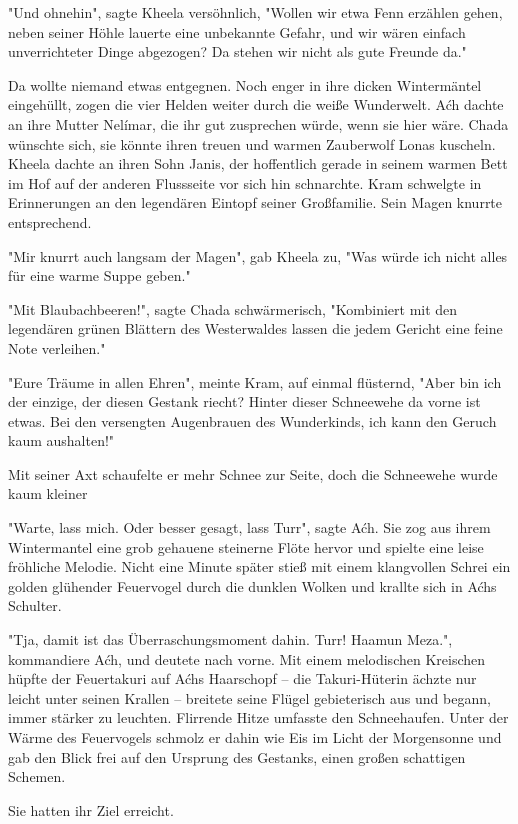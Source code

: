 \documentclass[10pt, a4paper, oneside]{book}
\begin{document}
"Und ohnehin", sagte Kheela versöhnlich, "Wollen wir etwa Fenn erzählen gehen, neben seiner Höhle lauerte eine unbekannte Gefahr, und wir wären einfach unverrichteter Dinge abgezogen? Da stehen wir nicht als gute Freunde da."

Da wollte niemand etwas entgegnen. Noch enger in ihre dicken Wintermäntel eingehüllt, zogen die vier Helden weiter durch die weiße Wunderwelt. Aćh dachte an ihre Mutter Nelímar, die ihr gut zusprechen würde, wenn sie hier wäre. Chada wünschte sich, sie könnte ihren treuen und warmen Zauberwolf Lonas kuscheln. Kheela dachte an ihren Sohn Janis, der hoffentlich gerade in seinem warmen Bett im Hof auf der anderen Flussseite vor sich hin schnarchte. Kram schwelgte in Erinnerungen an den legendären Eintopf seiner Großfamilie. Sein Magen knurrte entsprechend.

"Mir knurrt auch langsam der Magen", gab Kheela zu, "Was würde ich nicht alles für eine warme Suppe geben."

"Mit Blaubachbeeren!", sagte Chada schwärmerisch, "Kombiniert mit den legendären grünen Blättern des Westerwaldes lassen die jedem Gericht eine feine Note verleihen."

"Eure Träume in allen Ehren", meinte Kram, auf einmal flüsternd, "Aber bin ich der einzige, der diesen Gestank riecht? Hinter dieser Schneewehe da vorne ist etwas. Bei den versengten Augenbrauen des Wunderkinds, ich kann den Geruch kaum aushalten!"

Mit seiner Axt schaufelte er mehr Schnee zur Seite, doch die Schneewehe wurde kaum kleiner

"Warte, lass mich. Oder besser gesagt, lass Turr", sagte Aćh. Sie zog aus ihrem Wintermantel eine grob gehauene steinerne Flöte hervor und spielte eine leise fröhliche Melodie. Nicht eine Minute später stieß mit einem klangvollen Schrei ein golden glühender Feuervogel durch die dunklen Wolken und krallte sich in Aćhs Schulter.

"Tja, damit ist das Überraschungsmoment dahin. Turr! Haamun Meza.", kommandiere Aćh, und deutete nach vorne. Mit einem melodischen Kreischen hüpfte der Feuertakuri auf Aćhs Haarschopf – die Takuri-Hüterin ächzte nur leicht unter seinen Krallen – breitete seine Flügel gebieterisch aus und begann, immer stärker zu leuchten. Flirrende Hitze umfasste den Schneehaufen. Unter der Wärme des Feuervogels schmolz er dahin wie Eis im Licht der Morgensonne und gab den Blick frei auf den Ursprung des Gestanks, einen großen schattigen Schemen.

Sie hatten ihr Ziel erreicht.
\end{document}
